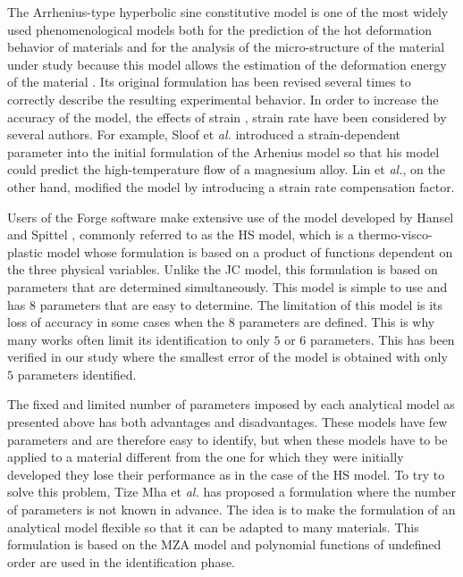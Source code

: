 \documentclass[twoside,english,1p,final,sort&compress]{elsarticle}
\makeatletter
\theoremstyle{plain}
\newcommand*{\eal}{et \emph{al.}\@\xspace}
\makeatother
\begin{document}
The Arrhenius-type hyperbolic sine constitutive model is one of the most widely used phenomenological models both for the prediction of the hot deformation behavior of materials and for the analysis of the micro-structure of the material under study because this model allows the estimation of the deformation energy of the material \cite{Jonas-1969, Zhang-2012, Mostafaei-2012}. Its original formulation has been revised several times to correctly describe the resulting experimental behavior. In order to increase the accuracy of the model, the effects of strain \cite{Slooff-2007, Li-2012, Xu-2013}, strain rate \cite{Lin-2008-C, Mandal-2009} have been considered by several authors. For example, Sloof \eal \cite{Slooff-2007} introduced a strain-dependent parameter into the initial formulation of the Arhenius model so that his model could predict the high-temperature flow of a magnesium alloy. Lin \eal \cite{Lin-2008-C}, on the other hand, modified the model by introducing a strain rate compensation factor.

Users of the Forge software make extensive use of the model developed by Hansel and Spittel \cite{Hensel-1978}, commonly referred to as the HS model, which is a thermo-visco-plastic model whose formulation is based on a product of functions dependent on the three physical variables.  Unlike the JC model, this formulation is based on parameters that are determined simultaneously. This model is simple to use and has $8$ parameters that are easy to determine. The limitation of this model is its loss of accuracy in some cases when the $8$ parameters are defined. This is why many works often limit its identification to only $5$ or $6$ parameters. This has been verified in our study where the smallest error of the model is obtained with only $5$ parameters identified.

The fixed and limited number of parameters imposed by each analytical model as presented above has both advantages and disadvantages. These models have few parameters and are therefore easy to identify, but when these models have to be applied to a material different from the one for which they were initially developed they lose their performance as in the case of the HS model. To try to solve this problem, Tize Mha \eal \cite{TizeMha-2022} has proposed a formulation where the number of parameters is not known in advance. The idea is to make the formulation of an analytical model flexible so that it can be adapted to many materials. This formulation is based on the MZA model and polynomial functions of undefined order are used in the identification phase. 
\end{document}
